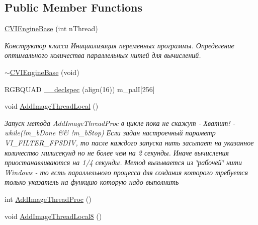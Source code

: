 \subsection*{Public Member Functions}
\begin{DoxyCompactItemize}
\item 
\hyperlink{class_c_v_i_engine_base_a1349de29adc90869f463b17fb03904c1}{C\+V\+I\+Engine\+Base} (int n\+Thread)
\begin{DoxyCompactList}\small\item\em Конструктор класса Инициализация переменных программы. Определение оптимального количества параллельных нитей для вычислений. \end{DoxyCompactList}\item 
\hyperlink{class_c_v_i_engine_base_a28dba2a06eda33294836c5241f497112}{$\sim$\+C\+V\+I\+Engine\+Base} (void)
\item 
R\+G\+B\+Q\+U\+A\+D \hyperlink{class_c_v_i_engine_base_acd0542a6476a6eed4568c900ab5af5d9}{\+\_\+\+\_\+declspec} (align(16)) m\+\_\+pal\+I\mbox{[}256\mbox{]}
\item 
void \hyperlink{class_c_v_i_engine_base_a6ca94a8d39e8a76e5be4698cc2eff06b}{Add\+Image\+Thread\+Local} ()
\begin{DoxyCompactList}\small\item\em Запуск метода Add\+Image\+Thread\+Proc в цикле пока не скажут -\/ Хватит! -\/ while(!m\+\_\+b\+Done \&\& !m\+\_\+b\+Stop) Если задан настроечный параметр V\+I\+\_\+\+F\+I\+L\+T\+E\+R\+\_\+\+F\+P\+S\+D\+I\+V, то пасле каждого запуска нить засыпает на указанное количество милисекунд но не более чем на 2 секунды. Иначе вычисления приостанавливаются на 1/4 секунды. Метод вызывается из \char`\"{}рабочей\char`\"{} нити Windows -\/ то есть параллельного процесса для создания которого требуется только указатель на функцию которую надо выполнить \end{DoxyCompactList}\item 
int \hyperlink{class_c_v_i_engine_base_ac9fbe14762f4d2bf7d0bffe451a329ee}{Add\+Image\+Thread\+Proc} ()
\item 
void \hyperlink{class_c_v_i_engine_base_a180f4a67ef6b4137c8b8565310aa7834}{Add\+Image\+Thread\+Local8} ()

\end{DoxyCompactItemize}
